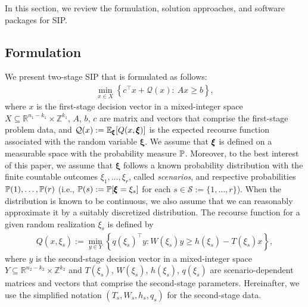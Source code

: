In this section, we review the formulation, solution approaches, and software packages for SIP.
\subsection{Formulation}
We present two-stage SIP that is formulated as follows:
\begin{align}
\min_{x\in X}{\left\{c^\top x + \mathcal{Q}(x):\ Ax\ge b\right\}}, \label{eq:rp}
\end{align}
\textcolor{NavyBlue}{where $x$ is the first-stage decision vector in a mixed-integer space $X\subseteq \mathbb{R}^{n_1-k_1}\times\mathbb{Z}^{k_1}$, $A$, $b$, $c$ are matrix and vectors that comprise the first-stage problem data, and $\mathcal{Q}(x):=\operatorname*{\mathbb{E}}_{\pmb{\xi}}[Q(x,\pmb{\xi})]$ is the expected recourse function associated with the random variable $\pmb{\xi}$.}
 We assume that $\pmb{\xi}$ is defined on a measurable space with the probability measure $\operatorname*{\mathbb{P}}$. Moreover, to the best interest of this paper, we assume that $\pmb{\xi}$ follows a known probability distribution with the finite countable outcomes $\xi_1,\ldots,\xi_r$, called \textit{scenarios}, and respective probabilities $\operatorname*{\mathbb{P}}(1),\ldots,\operatorname*{\mathbb{P}}(r)$ (i.e., $\operatorname*{\mathbb{P}}(s):=\operatorname*{\mathbb{P}}[\pmb{\xi}=\xi_s]$ for each $s\in\mathcal{S}:=\{1,\ldots,r\}$). When the distribution is known to be continuous, we also assume that we can reasonably approximate it by a suitably discretized distribution. 
The recourse function for a given random realization $\xi_s$ is defined by 
\begin{align}
Q(x,\xi_s):=\min_{y\in Y}\left\{q(\xi_s)^\top y : W(\xi_s)y\ge h(\xi_s)-T(\xi_s)x\right\}, \label{eq:rf}
\end{align}
\textcolor{NavyBlue}{where $y$ is the second-stage decision vector in a mixed-integer space $Y\subseteq\mathbb{R}^{n_2-k_2}\times\mathbb{Z}^{k_2}$ and $T(\xi_s)$, $W(\xi_s)$, $h(\xi_s)$, $q(\xi_s)$ are scenario-dependent matrices and vectors that comprise the second-stage parameters.}
Hereinafter, we use the simplified notation $(T_s,W_s,h_s,q_s)$ for the second-stage data. 

